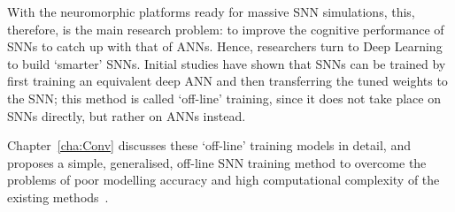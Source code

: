 \documentclass[10pt,journal,compsoc]{IEEEtran}
\begin{document}


With the neuromorphic platforms ready for massive SNN simulations, this, therefore, is the main research problem: to improve the cognitive performance of SNNs to catch up with that of ANNs.
Hence, researchers turn to Deep Learning to build `smarter' SNNs.
Initial studies have shown that SNNs can be trained by first training an equivalent deep ANN and then transferring the tuned weights to the SNN;
this method is called `off-line' training, since it does not take place on SNNs directly, but rather on ANNs instead.

Chapter~\ref{cha:Conv} discusses these `off-line' training models in detail, and proposes a simple, generalised, off-line SNN training method to overcome the problems of poor modelling accuracy and high computational complexity of the existing methods~\cite{Jug_etal_2012,hunsberger2015spiking,diehl2015fast}.


	
	
	
\end{document}

